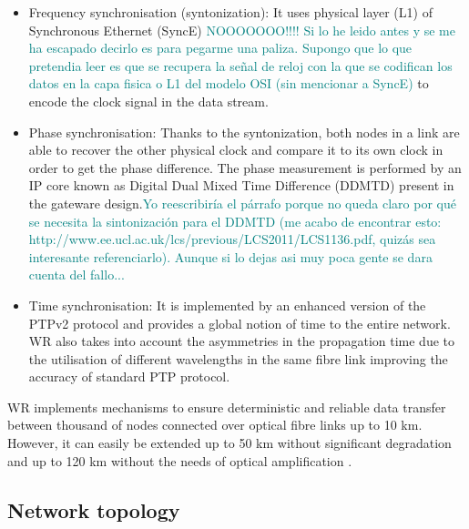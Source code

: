 \begin{itemize} 
	\item {Frequency synchronisation (syntonization): It uses
	physical layer (L1) of Synchronous Ethernet (SyncE) 
	\textcolor{teal}{NOOOOOOO!!!! Si lo he leido antes y se me ha escapado 
	decirlo es para pegarme una paliza. Supongo que lo que pretendia leer 
	es que se recupera la señal de reloj con la que se codifican los datos 
	en la capa fisica o L1 del modelo OSI (sin mencionar a SyncE)} to encode
	the clock signal in the data stream. } 
        
    \item {Phase synchronisation:
	Thanks to the syntonization, both nodes in a link are able to
	recover the other physical clock and compare it to its own clock
	in order to get the phase difference. The phase measurement is
	performed by an IP core known as Digital Dual Mixed Time
	Difference (DDMTD) present in the gateware design.\textcolor{teal}{Yo 
	reescribiría el párrafo porque no queda claro por qué se necesita la 
	sintonización para el DDMTD (me acabo de encontrar esto: 
	http://www.ee.ucl.ac.uk/lcs/previous/LCS2011/LCS1136.pdf, quizás sea 
	interesante referenciarlo). Aunque si lo dejas asi muy poca gente se 
	dara cuenta del fallo...}} 
    
    \item {Time synchronisation: It is implemented by an enhanced
	version of the PTPv2 protocol and provides a global
	notion of time to the entire network. WR also takes into
	account the asymmetries in the propagation time due to
	the utilisation of different wavelengths in the same
	fibre link improving the accuracy of standard PTP
	protocol.} 
\end{itemize}

WR implements mechanisms to ensure deterministic and reliable data transfer
between thousand of nodes connected over optical fibre links up to 10 km.
However, it can easily be extended up to 50 km without significant degradation
and up to 120 km without the needs of optical amplification \cite{Kaur2017}.

\subsection{Network topology} \label{subsec:wr-net}

